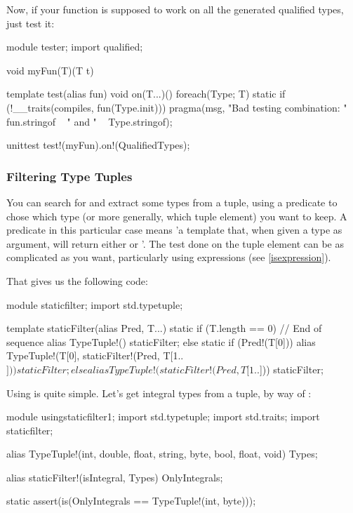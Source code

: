 Now, if your function is supposed to work on all the generated qualified types, just test it:

\begin{dcode}
module tester;
import qualified;

void myFun(T)(T t) {}

template test(alias fun)
{
    void on(T...)()
    {
        foreach(Type; T)
            static if (!__traits(compiles, fun(Type.init)))
                pragma(msg, "Bad testing combination: " 
                          ~ fun.stringof ~ " and " ~ Type.stringof);
    }
}
   
unittest 
{
    test!(myFun).on!(QualifiedTypes);
}
\end{dcode}

\subsubsection{Filtering Type Tuples}\label{staticfilter}

You can search for and extract some types from a tuple, using a predicate to chose which type (or more generally, which tuple element) you want to keep. A predicate in this particular case means 'a template that, when given a type as argument, will return either  or '. The test done on the tuple element can be as complicated as you want, particularly using \DD{()} expressions (see \autoref{isexpression}).

That gives us the following code:

\begin{dcode}
module staticfilter;
import std.typetuple;

template staticFilter(alias Pred, T...)
{
    static if (T.length == 0) // End of sequence
        alias TypeTuple!() staticFilter;
    else static if (Pred!(T[0]))
        alias TypeTuple!(T[0], staticFilter!(Pred, T[1..$])) staticFilter;
    else
        alias TypeTuple!(      staticFilter!(Pred, T[1..$])) staticFilter;
}
\end{dcode}

Using  is quite simple. Let's get integral types from a tuple, by way of :

\begin{dcode}
module usingstaticfilter1;
import std.typetuple;
import std.traits;
import staticfilter;

alias TypeTuple!(int, double, float, string, byte, bool, float, void) Types;

alias staticFilter!(isIntegral, Types) OnlyIntegrals;

static assert(is(OnlyIntegrals == TypeTuple!(int, byte)));
\end{dcode}

